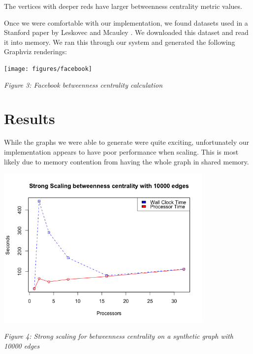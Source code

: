 \documentclass[11pt,a4paper,titlepage]{article}
\begin{document}
The vertices with deeper reds have larger betweenness centrality metric values.

Once we were comfortable with our implementation, we found datasets used in a
Stanford paper by Leskovec and Mcauley \cite{leskovec2012learning}. We
downloaded this dataset and read it into memory. We ran this through our system
and generated the following Graphviz renderings:

\begin{center}
\texttt{[image: figures/facebook]}
\end{center}
\begin{center}
\textit{Figure 3: Facebook betweenness centrality calculation}
\end{center}



\section{Results} %
\label{sec:results}

While the graphs we were able to generate were quite exciting, unfortunately
our implementation appears to have poor performance when scaling. This is most
likely due to memory contention from having the whole graph in shared memory.

\begin{center}
\includegraphics[width=0.8\textwidth]{figures/strong}
\end{center}
\begin{center}
\textit{Figure 4: Strong scaling for betweenness centrality on a synthetic
graph with 10000 edges}
\end{center}
\end{document}
